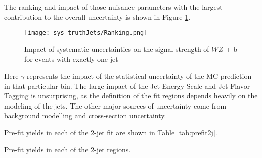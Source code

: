 The ranking and impact of those nuisance parameters with the largest contribution to the overall uncertainty is shown in Figure \ref{fig:ranking_1j}.

\begin{figure}[H]
    \centering
    \texttt{[image: sys\_truthJets/Ranking.png]}
    \caption{Impact of systematic uncertainties on the signal-strength of $WZ$ + b for events with exactly one jet}
    \label{fig:ranking_1j}
\end{figure}

Here $\gamma$ represents the impact of the statistical uncertainty of the MC prediction in that particular bin. The large impact of the Jet Energy Scale and Jet Flavor Tagging is unsurprising, as the definition of the fit regions depends heavily on the modeling of the jets. The other major sources of uncertainty come from background modelling and cross-section uncertainty. %




Pre-fit yields in each of the 2-jet fit are shown in Table \ref{tab:prefit2j}.

\begin{table}[H]
\begin{adjustwidth}{-3em}{-3em}
\small

\caption{Pre-fit yields in each of the 2-jet regions.}                                     
\label{tab:prefit2j}
\end{adjustwidth}
\end{table}

